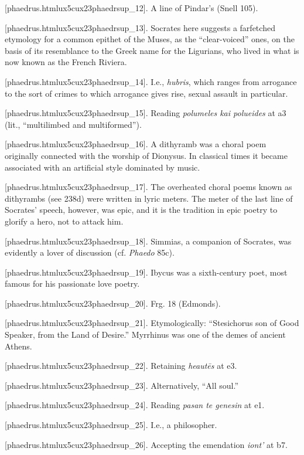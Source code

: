 [phaedrus.htmlux5cux23phaedrsup_12]. A line of Pindar's (Snell
105).

[phaedrus.htmlux5cux23phaedrsup_13]. Socrates here suggests a
farfetched etymology for a common epithet of the Muses, as the
“clear-voiced” ones, on the basis of its resemblance to the Greek name
for the Ligurians, who lived in what is now known as the French Riviera.

[phaedrus.htmlux5cux23phaedrsup_14]. I.e., {\em hubris}, which
ranges from arrogance to the sort of crimes to which arrogance gives
rise, sexual assault in particular.

[phaedrus.htmlux5cux23phaedrsup_15]. Reading {\em polumeles kai
polueides} at a3 (lit., “multilimbed and multiformed”).

[phaedrus.htmlux5cux23phaedrsup_16]. A dithyramb was a choral
poem originally connected with the worship of Dionysus. In classical
times it became associated with an artificial style dominated by music.

[phaedrus.htmlux5cux23phaedrsup_17]. The overheated choral
poems known as dithyrambs (see 238d) were written in lyric meters. The
meter of the last line of Socrates' speech, however, was epic, and it is
the tradition in epic poetry to glorify a hero, not to attack him.

[phaedrus.htmlux5cux23phaedrsup_18]. Simmias, a companion of
Socrates, was evidently a lover of discussion (cf. {\em Phaedo} 85c).

[phaedrus.htmlux5cux23phaedrsup_19]. Ibycus was a sixth-century
poet, most famous for his passionate love poetry.

[phaedrus.htmlux5cux23phaedrsup_20]. Frg. 18 (Edmonds).

[phaedrus.htmlux5cux23phaedrsup_21]. Etymologically:
“Stesichorus son of Good Speaker, from the Land of Desire.” Myrrhinus
was one of the demes of ancient Athens.

[phaedrus.htmlux5cux23phaedrsup_22]. Retaining {\em heautēs} at
e3.

[phaedrus.htmlux5cux23phaedrsup_23]. Alternatively, “All soul.”

[phaedrus.htmlux5cux23phaedrsup_24]. Reading {\em pasan te
genesin} at e1.

[phaedrus.htmlux5cux23phaedrsup_25]. I.e., a philosopher.

[phaedrus.htmlux5cux23phaedrsup_26]. Accepting the emendation
{\em iont'} at b7.

